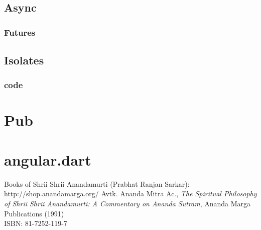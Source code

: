 \documentclass[10pt]{book}
\begin{document}
\subsection{Async}
\lipsum[38]
\subsubsection{Futures}
\lipsum[39]
\subsection{Isolates}
\lipsum[40]
\subsubsection{code}
\lipsum[41]


\section{Pub}

\section{angular.dart}


\backmatter
%
\begin{thebibliography}{99}
Books of Shrii Shrii Anandamurti (Prabhat Ranjan Sarkar): \\
http://shop.anandamarga.org/
Avtk. Ananda Mitra Ac., \emph{The Spiritual Philosophy of Shrii Shrii Anandamurti: A Commentary on Ananda Sutram}, Ananda Marga Publications (1991) \\
ISBN: 81-7252-119-7
\end{thebibliography}
\end{document}

